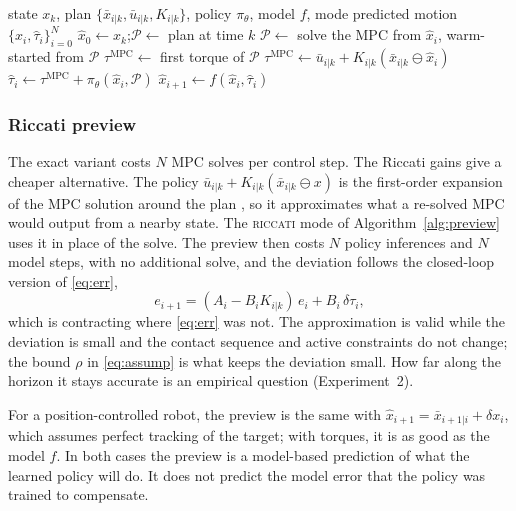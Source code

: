 \documentclass[conference]{IEEEtran}
\newcommand{\mpc}{\mathrm{MPC}}
\newcommand{\xb}{\bar{x}}
\newcommand{\ub}{\bar{u}}
\newcommand{\xh}{\hat{x}}
\begin{document}
\begin{algorithm}[t]
\caption{Residual-aware preview at time $k$}
\label{alg:preview}
\begin{algorithmic}[1]
\REQUIRE state $x_k$, plan $\{\xb_{i|k},\ub_{i|k},K_{i|k}\}$, policy $\pi_\theta$, model $f$, mode
\ENSURE predicted motion $\{\xh_i,\hat\tau_i\}_{i=0}^{N}$
\STATE $\xh_0\leftarrow x_k$;\quad $\mathcal P\leftarrow$ plan at time $k$
    \STATE $\mathcal P\leftarrow$ solve the MPC from $\xh_i$, warm-started from $\mathcal P$
    \STATE $\tau^{\mpc}\leftarrow$ first torque of $\mathcal P$
  \ELSE
    \STATE $\tau^{\mpc}\leftarrow\ub_{i|k}+K_{i|k}(\xb_{i|k}\ominus\xh_i)$ \hfill{}
  \ENDIF
  \STATE $\hat\tau_i\leftarrow\tau^{\mpc}+\pi_\theta(\xh_i,\mathcal P)$
  \STATE $\xh_{i+1}\leftarrow f(\xh_i,\hat\tau_i)$
\ENDFOR
\end{algorithmic}
\end{algorithm}

\subsubsection{Riccati preview}
The exact variant costs $N$ MPC solves per control step.
The Riccati gains give a cheaper alternative.
The policy $\ub_{i|k}+K_{i|k}(\xb_{i|k}\ominus x)$ is the first-order expansion of the MPC solution around the plan \cite{dantec2022firstorder}, so it approximates what a re-solved MPC would output from a nearby state.
The \textsc{riccati} mode of Algorithm~\ref{alg:preview} uses it in place of the solve.
The preview then costs $N$ policy inferences and $N$ model steps, with no additional solve, and the deviation follows the closed-loop version of \eqref{eq:err},
\begin{equation}
e_{i+1}=(A_i-B_iK_{i|k})\,e_i+B_i\,\delta\tau_i ,
\label{eq:errcl}
\end{equation}
which is contracting where \eqref{eq:err} was not.
The approximation is valid while the deviation is small and the contact sequence and active constraints do not change; the bound $\rho$ in \eqref{eq:assump} is what keeps the deviation small.
How far along the horizon it stays accurate is an empirical question (Experiment~2).

For a position-controlled robot, the preview is the same with $\xh_{i+1}=\xb_{i+1|i}+\delta x_i$, which assumes perfect tracking of the target; with torques, it is as good as the model $f$.
In both cases the preview is a model-based prediction of what the learned policy will do.
It does not predict the model error that the policy was trained to compensate.
\end{document}
